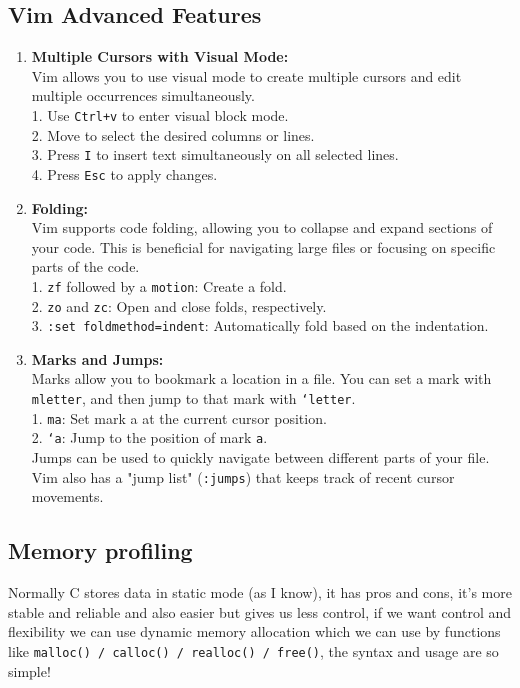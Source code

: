 \documentclass[titlepage]{article}
\begin{document}
\subsection{Vim Advanced Features}
\begin{enumerate}
\item \textbf{Multiple Cursors with Visual Mode:}\\
Vim allows you to use visual mode to create multiple cursors and edit multiple occurrences simultaneously.\\
1. Use \texttt{Ctrl+v} to enter visual block mode.\\
2. Move to select the desired columns or lines.\\
3. Press \texttt{I} to insert text simultaneously on all selected lines.\\
4. Press \texttt{Esc} to apply changes.
\item \textbf{Folding:}\\
Vim supports code folding, allowing you to collapse and expand sections of your code. This is beneficial for navigating large files or focusing on specific parts of the code.\\
1. \texttt{zf} followed by a \texttt{motion}: Create a fold.\\
2. \texttt{zo} and \texttt{zc}: Open and close folds, respectively.\\
3. \texttt{:set foldmethod=indent}: Automatically fold based on the indentation.\\
\item \textbf{Marks and Jumps:}\\
Marks allow you to bookmark a location in a file. You can set a mark with \texttt{m{letter}}, and then jump to that mark with \texttt{`{letter}}.\\
1. \texttt{ma}: Set mark a at the current cursor position.\\
2. \texttt{`a}: Jump to the position of mark \texttt{a}.\\
Jumps can be used to quickly navigate between different parts of your file. Vim also has a "jump list" (\texttt{:jumps}) that keeps track of recent cursor movements.
\end{enumerate}
\subsection{Memory profiling}
Normally C stores data in static mode (as I know), it has pros and cons, it's more stable and reliable and also easier but gives us less control, if we want control and flexibility we can use dynamic memory allocation
which we can use by functions like \texttt{malloc() / calloc() / realloc() / free()}, \newline the syntax and usage are so simple!
\end{document}
